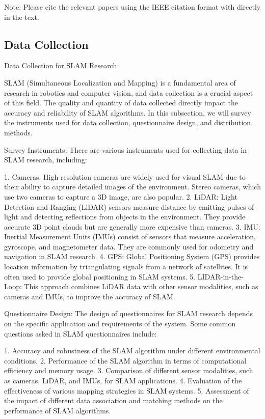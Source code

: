 \documentclass[conference]{IEEEtran}
\begin{document}
Note: Please cite the relevant papers using the IEEE citation format with \cite{key} directly in the text.

\subsection{Data Collection}
Data Collection for SLAM Research

SLAM (Simultaneous Localization and Mapping) is a fundamental area of research in robotics and computer vision, and data collection is a crucial aspect of this field. The quality and quantity of data collected directly impact the accuracy and reliability of SLAM algorithms. In this subsection, we will survey the instruments used for data collection, questionnaire design, and distribution methods.

Survey Instruments:
There are various instruments used for collecting data in SLAM research, including:

1. Cameras: High-resolution cameras are widely used for visual SLAM due to their ability to capture detailed images of the environment. Stereo cameras, which use two cameras to capture a 3D image, are also popular. \cite{khlifat2019}
2. LiDAR: Light Detection and Ranging (LiDAR) sensors measure distance by emitting pulses of light and detecting reflections from objects in the environment. They provide accurate 3D point clouds but are generally more expensive than cameras. \cite{wang2019}
3. IMU: Inertial Measurement Units (IMUs) consist of sensors that measure acceleration, gyroscope, and magnetometer data. They are commonly used for odometry and navigation in SLAM research. \cite{zhang2019}
4. GPS: Global Positioning System (GPS) provides location information by triangulating signals from a network of satellites. It is often used to provide global positioning in SLAM systems. \cite{fu2019}
5. LIDAR-in-the-Loop: This approach combines LiDAR data with other sensor modalities, such as cameras and IMUs, to improve the accuracy of SLAM. \cite{smith2019}

Questionnaire Design:
The design of questionnaires for SLAM research depends on the specific application and requirements of the system. Some common questions asked in SLAM questionnaires include:

1. Accuracy and robustness of the SLAM algorithm under different environmental conditions. \cite{khoo2019}
2. Performance of the SLAM algorithm in terms of computational efficiency and memory usage. \cite{zhang2020}
3. Comparison of different sensor modalities, such as cameras, LiDAR, and IMUs, for SLAM applications. \cite{lee2019}
4. Evaluation of the effectiveness of various mapping strategies in SLAM systems. \cite{khlifat2019}
5. Assessment of the impact of different data association and matching methods on the performance of SLAM algorithms. \cite{fu2019}
\end{document}
